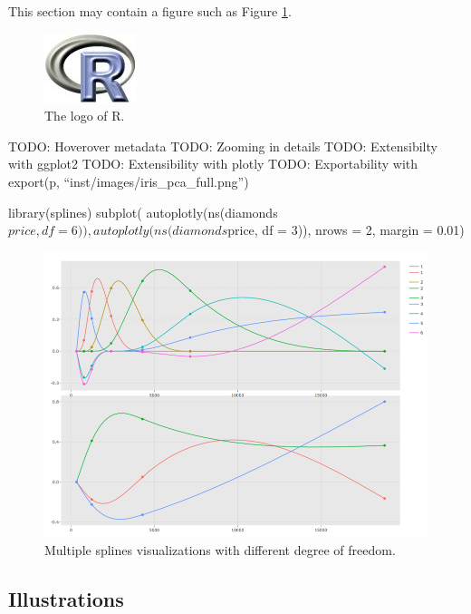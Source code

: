 This section may contain a figure such as Figure \ref{figure:rlogo}.

\begin{figure}[htbp]
  \centering
  \includegraphics{Rlogo}
  \caption{The logo of R.}
  \label{figure:rlogo}
\end{figure}

TODO: Hoverover metadata TODO: Zooming in details TODO: Extensibilty
with ggplot2 TODO: Extensibility with plotly TODO: Exportability with
export(p, ``inst/images/iris\_pca\_full.png'')

\begin{Schunk}
\begin{Sinput}
library(splines)
subplot(
  autoplotly(ns(diamonds$price, df = 6)),
  autoplotly(ns(diamonds$price, df = 3)), nrows = 2, margin = 0.01)
\end{Sinput}
\end{Schunk}

\begin{figure}[htbp]
  \centering
  \includegraphics[width=145mm,scale=0.8]{images/splines_subplot.png}
  \caption{Multiple splines visualizations with different degree of freedom.}
  \label{figure:splines_subplot}
\end{figure}

\subsection{Illustrations}\label{illustrations}

